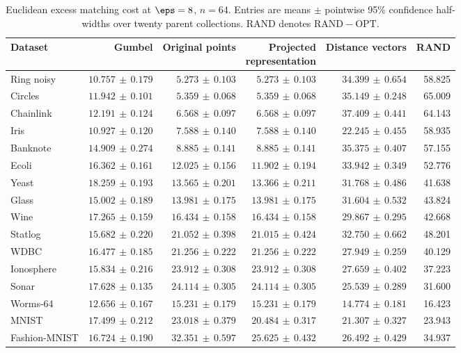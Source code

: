 \begin{table}[p]
\centering\scriptsize
\setlength{\tabcolsep}{3pt}
\caption{Euclidean excess matching cost at $\eps=8$, $n=64$. Entries are means $\pm$ pointwise 95\% confidence half-widths over twenty parent collections. RAND denotes $\mathrm{RAND}-\mathrm{OPT}$.}
\label{tab:exp-bench-p1-eps8}
\begin{tabular}{lrrrrr}
\toprule
Dataset & Gumbel & Original points & \shortstack{Projected\\representation} & Distance vectors & RAND\\
\midrule
Ring noisy & $10.757\,\pm\,0.179$ & $5.273\,\pm\,0.103$ & $5.273\,\pm\,0.103$ & $34.399\,\pm\,0.654$ & 58.825\\
Circles & $11.942\,\pm\,0.101$ & $5.359\,\pm\,0.068$ & $5.359\,\pm\,0.068$ & $35.149\,\pm\,0.248$ & 65.009\\
Chainlink & $12.191\,\pm\,0.124$ & $6.568\,\pm\,0.097$ & $6.568\,\pm\,0.097$ & $37.409\,\pm\,0.441$ & 64.143\\
Iris & $10.927\,\pm\,0.120$ & $7.588\,\pm\,0.140$ & $7.588\,\pm\,0.140$ & $22.245\,\pm\,0.455$ & 58.935\\
Banknote & $14.909\,\pm\,0.274$ & $8.885\,\pm\,0.141$ & $8.885\,\pm\,0.141$ & $35.375\,\pm\,0.407$ & 57.155\\
Ecoli & $16.362\,\pm\,0.161$ & $12.025\,\pm\,0.156$ & $11.902\,\pm\,0.194$ & $33.942\,\pm\,0.349$ & 52.776\\
Yeast & $18.259\,\pm\,0.193$ & $13.565\,\pm\,0.201$ & $13.366\,\pm\,0.211$ & $31.768\,\pm\,0.486$ & 41.638\\
Glass & $15.002\,\pm\,0.189$ & $13.981\,\pm\,0.175$ & $13.981\,\pm\,0.175$ & $31.604\,\pm\,0.532$ & 43.824\\
Wine & $17.265\,\pm\,0.159$ & $16.434\,\pm\,0.158$ & $16.434\,\pm\,0.158$ & $29.867\,\pm\,0.295$ & 42.668\\
Statlog & $15.682\,\pm\,0.220$ & $21.052\,\pm\,0.398$ & $21.015\,\pm\,0.424$ & $32.750\,\pm\,0.662$ & 48.201\\
WDBC & $16.477\,\pm\,0.185$ & $21.256\,\pm\,0.222$ & $21.256\,\pm\,0.222$ & $27.949\,\pm\,0.259$ & 40.129\\
Ionosphere & $15.834\,\pm\,0.216$ & $23.912\,\pm\,0.308$ & $23.912\,\pm\,0.308$ & $27.659\,\pm\,0.402$ & 37.223\\
Sonar & $17.628\,\pm\,0.135$ & $24.114\,\pm\,0.305$ & $24.114\,\pm\,0.305$ & $25.539\,\pm\,0.289$ & 31.600\\
Worms-64 & $12.656\,\pm\,0.167$ & $15.231\,\pm\,0.179$ & $15.231\,\pm\,0.179$ & $14.774\,\pm\,0.181$ & 16.423\\
MNIST & $17.499\,\pm\,0.212$ & $23.018\,\pm\,0.379$ & $20.484\,\pm\,0.317$ & $21.307\,\pm\,0.327$ & 23.943\\
Fashion-MNIST & $16.724\,\pm\,0.190$ & $32.351\,\pm\,0.597$ & $25.625\,\pm\,0.432$ & $26.492\,\pm\,0.429$ & 34.937\\
\bottomrule
\end{tabular}
\end{table}

